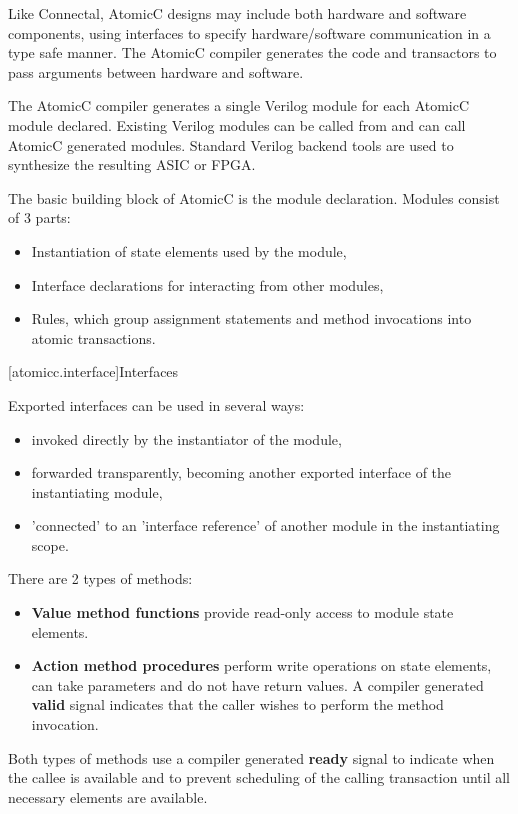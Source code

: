 Like Connectal, AtomicC designs may include both hardware and
software components, using interfaces to specify hardware/software communication
in a type safe manner. The AtomicC compiler generates the code and transactors to pass
arguments between hardware and software.

The AtomicC compiler 
generates a single Verilog module for each AtomicC module declared.
Existing Verilog modules can be called from and can call AtomicC
generated modules.
Standard Verilog backend tools are used to synthesize
the resulting ASIC or FPGA.

The basic building block of AtomicC is the module declaration.
Modules consist of 3 parts:
\begin{itemize}
\item Instantiation of state elements used by the module,
\item Interface declarations for interacting from other modules,
\item Rules, which group assignment statements and method invocations into atomic transactions.
\end{itemize}

[atomicc.interface]{Interfaces}

Exported interfaces can be used in several ways:
\begin{itemize}
\item invoked directly by the instantiator of the module,
\item forwarded transparently, becoming another exported interface of the instantiating module,
\item 'connected' to an 'interface reference' of another module in the instantiating scope.
\end{itemize}

There are 2 types of methods:
\begin{itemize}
\item \textbf{Value method functions} provide read-only access to module state elements.
\item \textbf{Action method procedures} perform write operations on state elements,
can take parameters and do not have return values.
A compiler generated
\textbf{valid} signal indicates that the caller wishes to perform the method invocation.
\end{itemize}

Both types of methods use a compiler generated \textbf{ready} signal
to indicate when the callee is available and
to prevent scheduling of the calling transaction until all necessary elements are
available.

